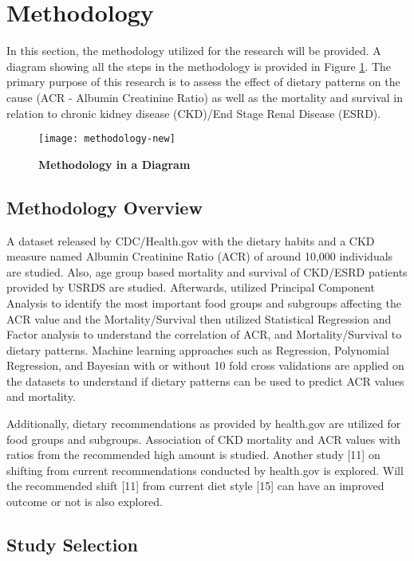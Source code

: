 \section{Methodology}
In this section, the methodology utilized for the research will be provided. A diagram showing all the steps in the methodology is provided in Figure \ref{methodology-new}. The primary purpose of this research is to assess the effect of dietary patterns on the cause (ACR - Albumin Creatinine Ratio) as well as the mortality and survival in relation to chronic kidney disease (CKD)/End Stage Renal Disease (ESRD).

\begin{figure}
\centering
\texttt{[image: methodology-new]}
\caption{\textbf{Methodology in a Diagram}}
\label{methodology-new}
\end{figure}

\subsection{Methodology Overview}
\noindent  A dataset released by CDC/Health.gov with the dietary habits and a CKD measure named Albumin Creatinine Ratio (ACR) of around 10,000 individuals are studied. Also, age group based mortality and survival of CKD/ESRD patients provided by USRDS are studied. Afterwards, utilized Principal Component Analysis to identify the most important food groups and subgroups affecting the ACR value and the Mortality/Survival then utilized Statistical Regression and Factor analysis to understand the correlation of ACR, and Mortality/Survival to dietary patterns. Machine learning approaches such as Regression, Polynomial Regression, and Bayesian with or without 10 fold cross validations are applied on the datasets to understand if dietary patterns can be used to predict ACR values and mortality. 

\noindent Additionally, dietary recommendations as provided by health.gov are utilized for food groups and subgroups. Association of CKD mortality and ACR values with ratios from the recommended high amount is studied. Another study [11] on shifting from current recommendations conducted by health.gov is explored. Will the recommended shift [11] from current diet style [15] can have an improved outcome or not is also explored. 

\subsection{Study Selection}

